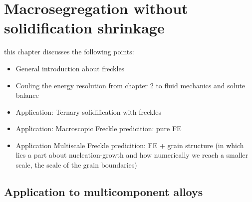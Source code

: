 \chapter{Macrosegregation without solidification shrinkage}
\begin{nolinkcolors} 
\minitoc
\end{nolinkcolors}
\newpage

this chapter discusses the following points:
\begin{itemize}
\item General introduction about freckles
\item Couling the energy resolution from chapter 2 to fluid mechanics and solute balance
\item Application: Ternary solidification with freckles
\item Application: Macroscopic Freckle predicition: pure FE
\item Application Multiscale Freckle predicition: FE + grain structure (in which lies a part about nucleation-growth and how numerically 
		we reach a smaller scale, the scale of the grain boundaries)
\end{itemize}


\section{Application to multicomponent alloys}

